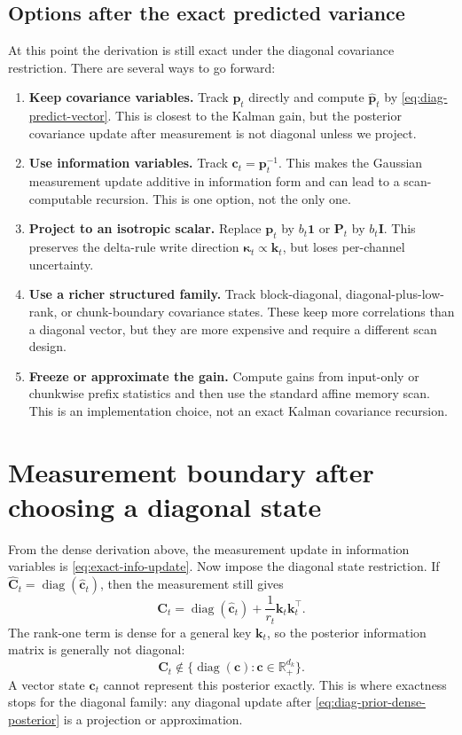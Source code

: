 \documentclass[11pt]{article}
\newcommand{\R}{\mathbb{R}}
\newcommand{\ve}[1]{\boldsymbol{#1}}
\newcommand{\tr}{\intercal}
\DeclareMathOperator{\diag}{diag}
\begin{document}
\subsection*{Options after the exact predicted variance}

At this point the derivation is still exact under the diagonal covariance restriction. There
are several ways to go forward:
\begin{enumerate}[leftmargin=1.6em,itemsep=3pt]
  \item \textbf{Keep covariance variables.} Track $\ve{p}_t$ directly and compute
  $\widehat{\ve{p}}_t$ by \eqref{eq:diag-predict-vector}. This is closest to the Kalman gain,
  but the posterior covariance update after measurement is not diagonal unless we project.

  \item \textbf{Use information variables.} Track $\ve{c}_t=\ve{p}_t^{-1}$. This makes the
  Gaussian measurement update additive in information form and can lead to a scan-computable
  recursion. This is one option, not the only one.

  \item \textbf{Project to an isotropic scalar.} Replace $\ve{p}_t$ by $b_t\ve{1}$ or
  $\ve{P}_t$ by $b_t\ve{I}$. This preserves the delta-rule write direction
  $\ve{\kappa}_t\propto\ve{k}_t$, but loses per-channel uncertainty.

  \item \textbf{Use a richer structured family.} Track block-diagonal, diagonal-plus-low-rank,
  or chunk-boundary covariance states. These keep more correlations than a diagonal vector,
  but they are more expensive and require a different scan design.

  \item \textbf{Freeze or approximate the gain.} Compute gains from input-only or chunkwise
  prefix statistics and then use the standard affine memory scan. This is an implementation
  choice, not an exact Kalman covariance recursion.
\end{enumerate}

\section{Measurement boundary after choosing a diagonal state}

From the dense derivation above, the measurement update in information variables is
\eqref{eq:exact-info-update}. Now impose the diagonal state restriction. If
$\widehat{\ve{C}}_t=\diag(\widehat{\ve{c}}_t)$, then the measurement still gives
\begin{equation}
  \ve{C}_t
  =
  \diag(\widehat{\ve{c}}_t)+\frac{1}{r_t}\ve{k}_t\ve{k}_t^{\tr}.
  \label{eq:diag-prior-dense-posterior}
\end{equation}
The rank-one term is dense for a general key $\ve{k}_t$, so the posterior information matrix
is generally not diagonal:
\[
  \ve{C}_t\notin
  \{\diag(\ve{c}):\ve{c}\in\R_+^{d_k}\}.
\]
A vector state $\ve{c}_t$ cannot represent this posterior exactly. This is where exactness
stops for the diagonal family: any diagonal update after \eqref{eq:diag-prior-dense-posterior}
is a projection or approximation.
\end{document}
